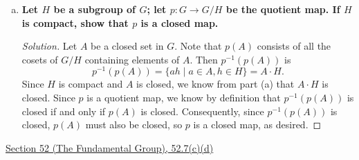 \documentclass[11pt]{article}
\newenvironment{solution}
  {\renewcommand\qedsymbol{$\blacksquare$}\begin{proof}[Solution]}
  {\end{proof}}
\begin{document}
\begin{enumerate}[a)]
\begin{solution}
    To summarize, we have that $f^{-1}(A^C)$ is an open set in $G \times G$, and $\{ c\}$ and $B$ are each compact in $G$, with $\{c \} \times B \subseteq f^{-1}(A^C)$. It follows by Exercise 26.9 that there exist open sets $W$ and $V$ in $G$ such that
    \[
        \{ c \} \times B \subseteq W \times V \subseteq f^{-1}(A^C).
    \]
    Note that $c \in W$ by construction, and $W \times B \subseteq W \times V$. Consequently, since $W \times B \subseteq W \times V \subseteq f^{-1}(A^C)$, it follows that $f(W \times B) \subseteq A^C$, or equivalently
    \[
        W \cdot B^{-1} \subseteq A^C.
    \]
    It follows that $(W \cdot B^{-1}) \cap A = \varnothing$. Consequently, $wb^{-1} \neq a$, or $w \neq ab$ for any $w \in W, a \in A$ and $b \in B$. Thus, $W \cap (A \cdot B) = \varnothing$. \\

    For any arbitrary $c \in (A \cdot B)^C$, we have found a neighborhood $W$ of $c$ such that $W \, \cap \, (A \cdot B) = \varnothing$, or equivalently, $W \subseteq (A \cdot B)^C$. It follows by definition that $(A \cdot B)^C$ is open in $G$,
    so $A \cdot B$ is closed, as desired.
    \end{solution}

    \item \textbf{Let $H$ be a subgroup of $G$; let $p \colon G \rightarrow G/H$ be the quotient map. If $H$ is compact, show that $p$ is a closed map.}
    
    \begin{solution}
    Let $A$ be a closed set in $G$. Note that $p(A)$ consists of all the cosets of $G/H$ containing elements of $A$. Then $p^{-1}(p(A))$ is
    \[
        p^{-1}(p(A)) = \{ ah \mid a \in A, h \in H \} = A \cdot H.
    \]
    Since $H$ is compact and $A$ is closed, we know from part (a) that $A \cdot H$ is closed. Since $p$ is a quotient map, we know by definition that
    $p^{-1}(p(A))$ is closed if and only if $p(A)$ is closed. Consequently, since $p^{-1}(p(A))$ is closed, $p(A)$ must also be closed, so $p$ is a closed map, as desired.
    \end{solution}
\end{enumerate}

\newpage

\underline{Section 52 (The Fundamental Group), 52.7(c)(d)} \\
\end{document}
